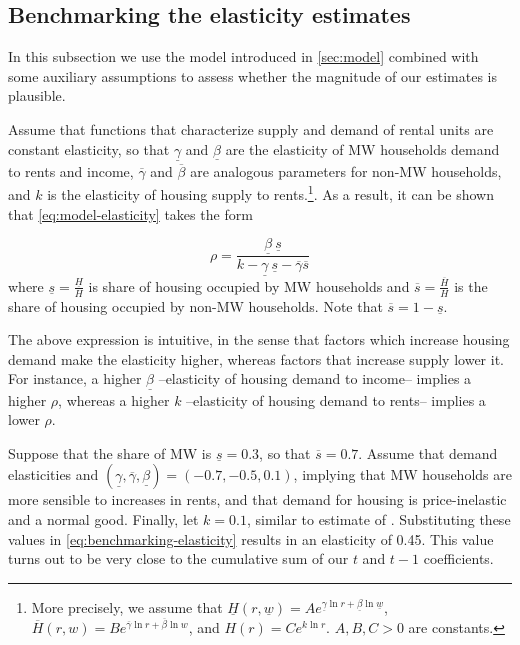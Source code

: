 \subsection{Benchmarking the elasticity estimates}\label{sec:benchmark}

In this subsection we use the model introduced in \autoref{sec:model} combined with some auxiliary 
assumptions to assess whether the magnitude of our estimates is plausible.

Assume that functions that characterize supply and demand of rental units are constant elasticity, 
so that $\underline{\gamma}$ and $\underline{\beta}$ are the elasticity of MW households demand to 
rents and income, $\overline{\gamma}$ and $\overline{\beta}$ are analogous parameters for non-MW 
households, and $k$ is the elasticity of housing supply to rents.\footnote{More precisely, we 
	assume that $\underline{H}(r, \underline{w}) = A e^{\underline{\gamma} \ln r + \underline{\beta} 
	\ln\underline{w}}$, $\overline{H}(r, w) = B e^{\overline{\gamma} \ln r + \overline{\beta} \ln 
	w}$, and $H(r) = C e^{k \ln r}$. $A, B, C > 0$ are constants.}. 
As a result, it can be shown that \autoref{eq:model-elasticity} takes the form

\begin{equation}\label{eq:benchmarking-elasticity}
	\rho = \frac{\underline{\beta} \ \underline{s}}
				{k - \underline{\gamma} \ \underline{s} 
					- \overline{\gamma} \overline{s}}
\end{equation}
where $\underline{s} = \frac{\underline{H}}{H}$ is share of housing occupied by MW households 
and $\overline{s} = \frac{\overline{H}}{H}$ is the share of housing occupied by non-MW households. 
Note that $\overline{s} = 1 - \underline{s}$.

The above expression is intuitive, in the sense that factors which increase housing demand make 
the elasticity higher, whereas factors that increase supply lower it. For instance, a higher 
$\underline{\beta}$ --elasticity of housing demand to income-- implies a higher $\rho$, whereas 
a higher $k$ --elasticity of housing demand to rents-- implies a lower $\rho$.

Suppose that the share of MW is $\underline{s} = 0.3$, so that $\overline{s}=0.7$. Assume that 
demand elasticities and $(\underline{\gamma}, \overline{\gamma}, \underline{\beta}) = (- 0.7, 
- 0.5, 0.1)$, implying that MW households are more sensible to increases in rents, and that 
demand for housing is price-inelastic and a normal good. Finally, let $k = 0.1$, similar to 
estimate of \textcite[][Table 5]{diamond2016determinants}. Substituting these values in 
\eqref{eq:benchmarking-elasticity} results in an elasticity of 0.45. This value turns out to be 
very close to the cumulative sum of our $t$ and $t-1$ coefficients.


